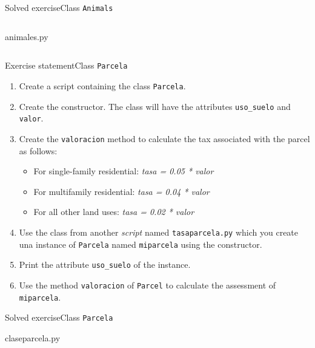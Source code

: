 \documentclass[10pt,compress]{beamer} %
\begin{document}
\begin{frame}{Solved exercise}{Class \texttt{Animals}}
	\vspace{-0.4cm}
    \begin{columns}
			\begin{block}{animales.py}
			\vspace{-0.3cm} 
			\vspace{-0.3cm} 
			\end{block}
	\end{columns}
\end{frame}
\begin{frame}{Exercise statement}{Class \texttt{Parcela}}
	\begin{enumerate}
		\item Create a script containing the class \texttt{Parcela}. 
		\item Create the constructor. The class will have the attributes \texttt{uso\_suelo} and \texttt{valor}.
		\item Create the \texttt{valoracion} method to calculate the tax associated with the parcel as follows: 
		\begin{itemize}
		\item For single-family residential: \textit{tasa = 0.05 * valor}
		\item For multifamily residential: \textit{tasa = 0.04 * valor}
		\item For all other land uses: \textit{tasa = 0.02 * valor}
		\end{itemize}
		\item Use the class from another \textit{script} named \texttt{tasaparcela.py} which you create una instance of \texttt{Parcela} named \texttt{miparcela} using the constructor.
		\item Print the attribute  \texttt{uso\_suelo} of the instance.
		\item Use the method \texttt{valoracion} of \texttt{Parcel} to calculate the assessment of \texttt{miparcela}.
	\end{enumerate}	
\end{frame}

\begin{frame}{Solved exercise}{Class \texttt{Parcela}}
	\vspace{-0.26cm}
			\begin{block}{claseparcela.py}
			\vspace{-0.3cm} 
			\vspace{-0.3cm} 
			\end{block}
\end{frame}
\end{document}
